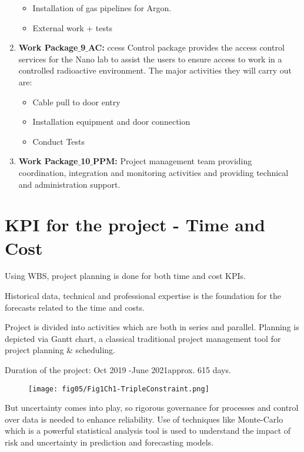 \begin{enumerate}
	\begin{itemize}
		\item Installation of gas pipelines for Argon. 
		\item  External work + tests
	\end{itemize}
	
	\item \textbf{Work Package$\_$9$\_$AC:} ccess Control package provides the access control services for the Nano lab to assist the users to ensure access to work in a controlled radioactive environment.
	The major activities they will carry out are: 
	
	\begin{itemize}
		\item Cable pull to door entry
		\item Installation equipment and door connection
		\item Conduct Tests
	\end{itemize}
	
	\item \textbf{Work Package$\_$10$\_$PPM:} Project management team providing coordination, integration and monitoring activities and providing technical and administration support.
	
	
\end{enumerate}


\section{KPI for the project - Time and Cost}

Using WBS, project planning is done for both time and cost KPIs.

Historical data, technical and professional expertise is the foundation for the forecasts related to the time and costs. 

Project is divided into activities which are both in series and parallel.
Planning is depicted via Gantt chart, a classical traditional project management tool for project planning \& scheduling.

Duration of the project: Oct 2019 -June 2021approx. 615 days. 


\begin{figure}
	\centering
	\texttt{[image: fig05/Fig1Ch1-TripleConstraint.png]}
\end{figure}

But uncertainty comes into play, so rigorous governance for processes and control over data is needed to enhance reliability. Use of techniques like Monte-Carlo which is a powerful statistical analysis tool is used to understand the impact of risk and uncertainty in prediction and forecasting models.

